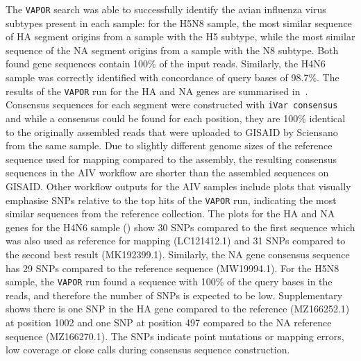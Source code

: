 The \texttt{VAPOR} search was able to successfully identify the avian influenza virus subtypes present in each sample: for the H5N8 sample, the most similar sequence of HA segment origins from a sample with the H5 subtype, while the most similar sequence of the NA segment origins from a sample with the N8 subtype. Both found gene sequences contain 100\% of the input reads. Similarly, the H4N6 sample was correctly identified with concordance of query bases of 98.7\%. The results of the \texttt{VAPOR} run for the HA and NA genes are summarised in~. \\
Consensus sequences for each segment were constructed with \texttt{iVar consensus} and while a consensus could be found for each position, they are 100\% identical to the originally assembled reads that were uploaded to \ac{GISAID} by Sciensano from the same sample. Due to slightly different genome sizes of the reference sequence used for mapping compared to the assembly, the resulting consensus sequences in the \ac{AIV} workflow are shorter than the assembled sequences on \ac{GISAID}. 
Other workflow outputs for the \ac{AIV} samples include plots that visually emphasise \acp{SNP} relative to the top hits of the \texttt{VAPOR} run, indicating the most similar sequences from the reference collection. The plots for the \ac{HA} and \ac{NA} genes for the H4N6 sample () show 30 \acp{SNP} compared to the first sequence which was also used as reference for mapping (LC121412.1) and 31 \acp{SNP} compared to the second best result (MK192399.1). Similarly, the \ac{NA} gene consensus sequence has 29 \acp{SNP} compared to the reference sequence (MW19994.1). For the H5N8 sample, the \texttt{VAPOR} run found a sequence with 100\% of the query bases in the reads, and therefore the number of \acp{SNP} is expected to be low. Supplementary~ shows there is one \ac{SNP} in the \ac{HA} gene compared to the reference (MZ166252.1) at position 1002 and one \ac{SNP} at position 497 compared to the \ac{NA} reference sequence (MZ166270.1). The \acp{SNP} indicate point mutations or mapping errors, low coverage or close calls during consensus sequence construction. \\

